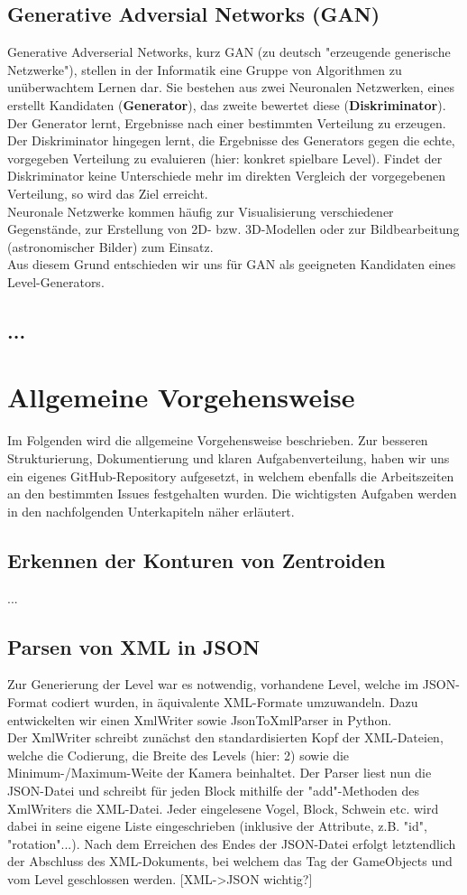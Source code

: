 \documentclass[11pt]{article}
\begin{document}
\subsection{Generative Adversial Networks (GAN)}
Generative Adverserial Networks, kurz GAN (zu deutsch "erzeugende generische Netzwerke"), stellen in der Informatik eine Gruppe von Algorithmen zu unüberwachtem Lernen dar. Sie bestehen aus zwei Neuronalen Netzwerken, eines erstellt Kandidaten (\textbf{Generator}), das zweite bewertet diese (\textbf{Diskriminator}).\\Der Generator lernt, Ergebnisse nach einer bestimmten Verteilung zu erzeugen. Der Diskriminator hingegen lernt, die Ergebnisse des Generators gegen die echte, vorgegeben Verteilung zu evaluieren (hier: konkret spielbare Level). Findet der Diskriminator keine Unterschiede mehr im direkten Vergleich der vorgegebenen Verteilung, so wird das Ziel erreicht.\\Neuronale Netzwerke kommen häufig zur Visualisierung verschiedener Gegenstände, zur Erstellung von 2D- bzw. 3D-Modellen oder zur Bildbearbeitung (astronomischer Bilder) zum Einsatz.\\Aus diesem Grund entschieden wir uns für GAN als geeigneten Kandidaten eines Level-Generators.
\subsection{...}
\section{Allgemeine Vorgehensweise}
Im Folgenden wird die allgemeine Vorgehensweise beschrieben. Zur besseren Strukturierung, Dokumentierung und klaren Aufgabenverteilung, haben wir uns ein eigenes GitHub-Repository aufgesetzt, in welchem ebenfalls die Arbeitszeiten an den bestimmten Issues festgehalten wurden. Die wichtigsten Aufgaben werden in den nachfolgenden Unterkapiteln näher erläutert.
\subsection{Erkennen der  Konturen von Zentroiden}
...
\subsection{Parsen von XML in JSON}
Zur Generierung der Level war es notwendig, vorhandene Level, welche im JSON-Format codiert wurden, in äquivalente XML-Formate umzuwandeln. Dazu entwickelten wir einen XmlWriter sowie JsonToXmlParser in Python. \\ Der XmlWriter schreibt zunächst den standardisierten Kopf der XML-Dateien, welche die Codierung, die Breite des Levels (hier: 2) sowie die Minimum-/Maximum-Weite der Kamera beinhaltet. Der Parser liest nun die JSON-Datei und schreibt für jeden Block mithilfe der "add"-Methoden des XmlWriters die XML-Datei. Jeder eingelesene Vogel, Block, Schwein etc. wird dabei in seine eigene Liste eingeschrieben (inklusive der Attribute, z.B. "id", "rotation"...). Nach dem Erreichen des Endes der JSON-Datei erfolgt letztendlich der Abschluss des XML-Dokuments, bei welchem das Tag der GameObjects und vom Level geschlossen werden. [XML->JSON wichtig?]
\end{document}
